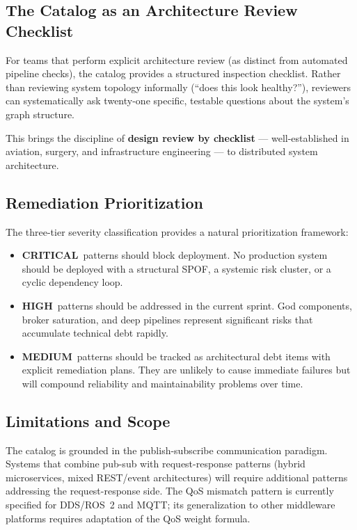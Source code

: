 \documentclass[11pt]{article}
\newcommand{\CRITICAL}{\textcolor{red!70!black}{\textbf{CRITICAL}}}
\newcommand{\HIGH}{\textcolor{orange!80!black}{\textbf{HIGH}}}
\newcommand{\MEDIUM}{\textcolor{yellow!50!black}{\textbf{MEDIUM}}}
\begin{document}
\subsection{The Catalog as an Architecture Review Checklist}

For teams that perform explicit architecture review (as distinct from automated pipeline checks), the catalog provides a structured inspection checklist. Rather than reviewing system topology informally (``does this look healthy?''), reviewers can systematically ask twenty-one specific, testable questions about the system's graph structure.

This brings the discipline of \textbf{design review by checklist} --- well-established in aviation, surgery, and infrastructure engineering --- to distributed system architecture.

\subsection{Remediation Prioritization}

The three-tier severity classification provides a natural prioritization framework:

\begin{itemize}[leftmargin=*]
\item \CRITICAL\ patterns should block deployment. No production system should be deployed with a structural SPOF, a systemic risk cluster, or a cyclic dependency loop.
\item \HIGH\ patterns should be addressed in the current sprint. God components, broker saturation, and deep pipelines represent significant risks that accumulate technical debt rapidly.
\item \MEDIUM\ patterns should be tracked as architectural debt items with explicit remediation plans. They are unlikely to cause immediate failures but will compound reliability and maintainability problems over time.
\end{itemize}

\subsection{Limitations and Scope}

The catalog is grounded in the publish-subscribe communication paradigm. Systems that combine pub-sub with request-response patterns (hybrid microservices, mixed REST/event architectures) will require additional patterns addressing the request-response side. The QoS mismatch pattern is currently specified for DDS/ROS~2 and MQTT; its generalization to other middleware platforms requires adaptation of the QoS weight formula.
\end{document}
